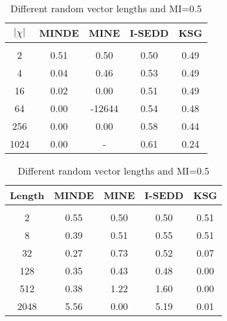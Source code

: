 \begin{table}[t]
\label{tab:mi_comparison}
\vspace{1em} %
\begin{center}
\begin{minipage}{0.45\textwidth}
\tiny
   
    \centering
    \caption{Different support dimension $|\support|$ and MI=0.5}
    \begin{tabular}{c|cccc}
        \multicolumn{1}{c}{\bf $|\chi|$} & \multicolumn{1}{c}{\bf MINDE} & \multicolumn{1}{c}{\bf MINE} & \multicolumn{1}{c}{\bf I-SEDD} & \multicolumn{1}{c}{\bf KSG} \\ 
        \hline \\
        2 & 0.51 & 0.50 & 0.50 & 0.49 \\
        4 & 0.04 & 0.46 & 0.53 & 0.49 \\
        16 & 0.02 & 0.00 & 0.51 & 0.49 \\
        64 & 0.00 & -12644 & 0.54 & 0.48 \\
        256 & 0.00 & 0.00 & 0.58 & 0.44 \\
        1024 & 0.00 & - & 0.61 & 0.24 \\
    \end{tabular}
    \label{tab:mi_big_support_table}
\end{minipage}
\begin{minipage}{0.45\textwidth}
\tiny

    \centering
    \caption{Different random vector lengths and MI=0.5}
    \begin{tabular}{c|cccc}
        \multicolumn{1}{c}{\bf Length} & \multicolumn{1}{c}{\bf MINDE} & \multicolumn{1}{c}{\bf MINE} & \multicolumn{1}{c}{\bf I-SEDD} & \multicolumn{1}{c}{\bf KSG} \\ 
        \hline \\
        2 & 0.55 & 0.50 & 0.50 & 0.51 \\
        8 & 0.39 & 0.51 & 0.55 & 0.51 \\
        32 & 0.27 & 0.73 & 0.52 & 0.07 \\
        128 & 0.35 & 0.43 & 0.48 & 0.00 \\
        512 & 0.38 & 1.22 & 1.60 & 0.00 \\
        2048 & 5.56 & 0.00 & 5.19 & 0.01 \\
    \end{tabular}
    \label{tab:mi_big_vector_table}
\end{minipage}


\end{center}
\end{table}
